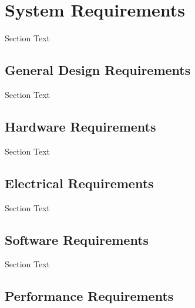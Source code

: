 %
%

\setcounter{section}{2}
\section{System Requirements}
Section Text


\break
\subsection{General Design Requirements}
Section Text


\break
\subsection{Hardware Requirements}
Section Text


\break
\subsection{Electrical Requirements}
Section Text


\break
\subsection{Software Requirements}
Section Text


\break
\subsection{Performance Requirements}



